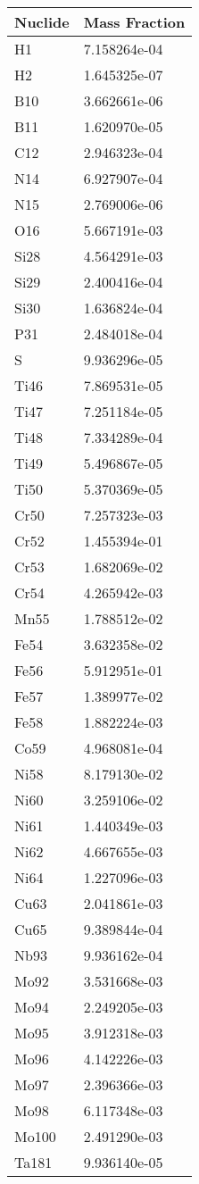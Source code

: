 \begin{centering}
\begin{longtable}[ht!]
\caption{Table showing the isotopic description of material M613}
\label{table:material_M613}
\end{longtable}\clearpage

\begin{longtable}[ht!]
{ p{} | p{} }
\hline
Nuclide & Mass Fraction\\
\hline
H1 & 7.158264e-04\\
H2 & 1.645325e-07\\
B10 & 3.662661e-06\\
B11 & 1.620970e-05\\
C12 & 2.946323e-04\\
N14 & 6.927907e-04\\
N15 & 2.769006e-06\\
O16 & 5.667191e-03\\
Si28 & 4.564291e-03\\
Si29 & 2.400416e-04\\
Si30 & 1.636824e-04\\
P31 & 2.484018e-04\\
S & 9.936296e-05\\
Ti46 & 7.869531e-05\\
Ti47 & 7.251184e-05\\
Ti48 & 7.334289e-04\\
Ti49 & 5.496867e-05\\
Ti50 & 5.370369e-05\\
Cr50 & 7.257323e-03\\
Cr52 & 1.455394e-01\\
Cr53 & 1.682069e-02\\
Cr54 & 4.265942e-03\\
Mn55 & 1.788512e-02\\
Fe54 & 3.632358e-02\\
Fe56 & 5.912951e-01\\
Fe57 & 1.389977e-02\\
Fe58 & 1.882224e-03\\
Co59 & 4.968081e-04\\
Ni58 & 8.179130e-02\\
Ni60 & 3.259106e-02\\
Ni61 & 1.440349e-03\\
Ni62 & 4.667655e-03\\
Ni64 & 1.227096e-03\\
Cu63 & 2.041861e-03\\
Cu65 & 9.389844e-04\\
Nb93 & 9.936162e-04\\
Mo92 & 3.531668e-03\\
Mo94 & 2.249205e-03\\
Mo95 & 3.912318e-03\\
Mo96 & 4.142226e-03\\
Mo97 & 2.396366e-03\\
Mo98 & 6.117348e-03\\
Mo100 & 2.491290e-03\\
Ta181 & 9.936140e-05\\


\end{longtable}
\end{centering}
